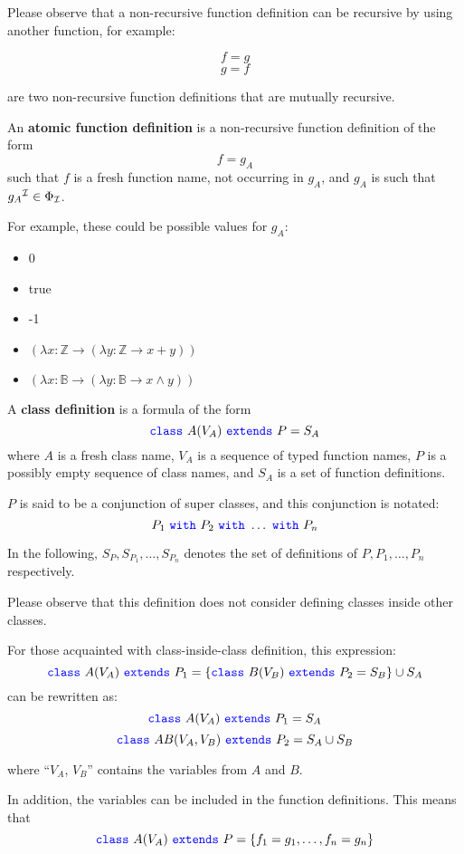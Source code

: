 Please observe that a non-recursive function definition can be recursive by using another function, for example:
\begin{center}
    \[f = g\]
    \[g = f\]
\end{center}
are two non-recursive function definitions that are mutually recursive.

An \textbf{atomic function definition} is a non-recursive function definition of the form
\[f = g_{A}\]
such that $f$ is a fresh function name, not occurring in $g_{A}$, and $g_{A}$ is such that ${g_{A}}^{\mathcal{I}} \in \Phi _{\mathcal{I}}$.

For example, these could be possible values for $g_{A}$:
\begin{itemize}
    \item 0
    \item true
    \item -1
    \item $(\lambda x: \mathbb{Z} \to (\lambda y: \mathbb{Z} \to x + y))$
    \item $(\lambda x: \mathbb{B} \to (\lambda y: \mathbb{B} \to x \land y) )$
\end{itemize}

A \textbf{class definition} is a formula of the form
\[{\color{blue}\texttt{{class}}}\ A (V_{A}) \ {\color{blue}\texttt{{extends}}}\ P = S_{A}\]
where $A$ is a fresh class name, $V_{A}$ is a sequence of typed function names, $P$ is a possibly empty sequence of class names, and $S_{A}$ is a set of function definitions.

$P$ is said to be a conjunction of super classes, and this conjunction is notated:
\[P_{1} \ \swith\ P_{2} \ \swith\ \ldots \ \swith\ P_{n}\]

In the following, $S_{P}, S_{P_{1}}, \ldots , S_{P_{n}}$ denotes the set of definitions of $P, P_{1}, \ldots, P_{n}$ respectively.

Please observe that this definition does not consider defining classes inside other classes.

For those acquainted with class-inside-class definition, this expression:
\[\sclass\ A (V_{A}) \ \sextends\ P_{1} = \{
\sclass\ B (V_{B}) \ \sextends\ P_{2} = S_{B} \} \cup S_{A}
\]
can be rewritten as:
\[\sclass\ A (V_{A}) \ \sextends\ P_{1} = S_{A}
\]
\[\sclass\ AB (V_{A}, V_{B}) \ \sextends\ P_{2} = S_{A} \cup S_{B}
\]

where ``$V_{A}$, $V_{B}$'' contains the variables from $A$ and $B$.

In addition, the variables can be included in the function definitions.
This means that
\[{\color{blue}\texttt{{class}}}\ A (V_{A}) \ {\color{blue}\texttt{{extends}}}\ P = \{
f_{1} = g_{1},
\ldots ,
f_{n} = g_{n}
\}
\]

